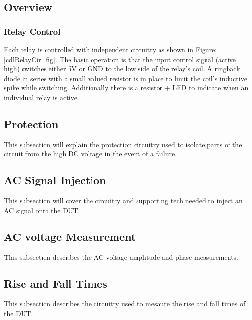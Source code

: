 \subsection {Overview}

\subsubsection{Relay Control}

Each relay is controlled with independent circuitry as shown in Figure: \ref{cdlRelayCir_fig}. The basic operation is that the input control signal (active high) switches either 5V or GND to the low side of the relay's coil. A ringback diode in series with a small valued resistor is in place to limit the coil's inductive spike while switching. Additionally there is a resistor + LED to indicate when an individual relay is active.

\subsection {Protection}

This subsection will explain the protection circuitry used to isolate parts of the circuit from the high DC voltage in the event of a failure.

\subsection {AC Signal Injection}

This subsection will cover the circuitry and supporting tech needed to inject an AC signal onto the DUT.

\subsection {AC voltage Measurement}

This subsection describes the AC voltage amplitude and phase measurements. 

\subsection {Rise and Fall Times}

This subsection describes the circuitry used to mesaure the rise and fall times of the DUT.


